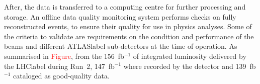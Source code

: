 After, the data is transferred to a computing centre for further processing and storage. An offline data quality monitoring system performs checks on fully reconstructed events, to ensure their quality for use in physics analyses. Some of the criteria to validate are requirements on the condition and performance of the beams and different \acrshort{ATLASlabel} sub-detectors at the time of operation. As summarised in \textcolor{red}{Figure}, from the 156~fb$^{-1}$ of integrated luminosity delivered by the \acrshort{LHClabel} during Run~2, 147~fb$^{-1}$ where recorded by the detector and 139~fb$^{-1}$ cataloged as good-quality data.

